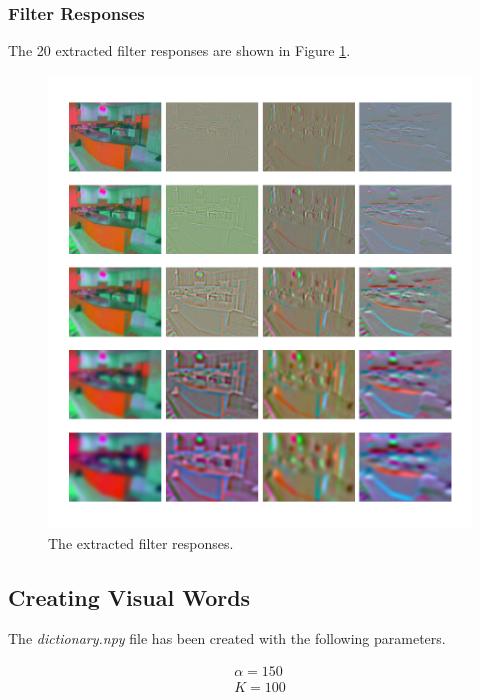 \documentclass[a4paper]{article}
\begin{document}
\subsubsection{Filter Responses}
The 20 extracted filter responses are shown in Figure \ref{filterresponses}.

\begin{figure}[!htbp]
\begin{center}
\includegraphics[scale=0.6]{filter_responses2.png}
\end{center}
\caption{The extracted filter responses.}\label{filterresponses}
\end{figure}

\newpage

\subsection{Creating Visual Words}
The \textit{dictionary.npy} file has been created with the following parameters.

\begin{equation*}
\begin{aligned}
    \alpha = 150\\
    K = 100
\end{aligned}
\end{equation*}
\end{document}
